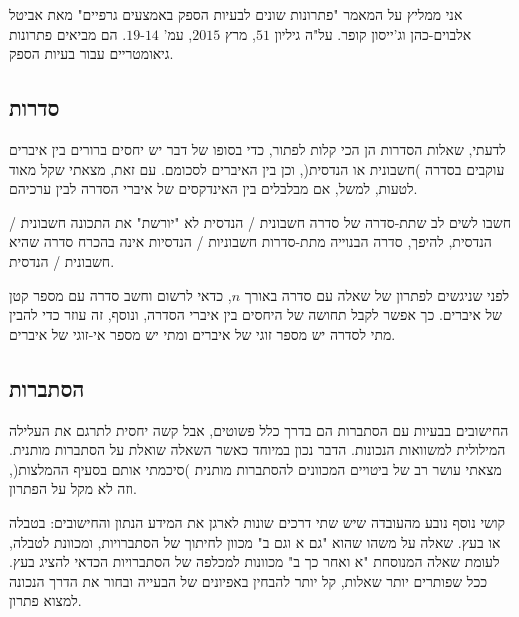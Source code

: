 אני ממליץ על המאמר "פתרונות שונים לבעיות הספק באמצעים גרפיים" מאת אביטל אלבוים-כהן וג'ייסון קופר. על"ה גיליון
$51$,
מרץ
$2015$,
עמ'
$14$-$19$.
הם מביאים פתרונות גיאומטריים עבור בעיות הספק.

\subsection*{סדרות}

לדעתי, שאלות הסדרות הן הכי קלות לפתור, כדי בסופו של דבר יש יחסים ברורים בין איברים עוקבים בסדרה )חשבונית או הנדסית(, וכן בין האיברים לסכומם. עם זאת, מצאתי שקל מאוד לטעות, למשל, אם מבלבלים בין האינדקסים של איברי הסדרה לבין ערכיהם.

חשבו לשים לב שתת-סדרה של סדרה חשבונית / הנדסית לא "יורשת" את התכונה חשבונית / הנדסית, להיפך, סדרה הבנוייה מתת-סדרות חשבוניות / הנדסיות אינה בהכרח סדרה שהיא חשבונית / הנדסית.

לפני שניגשים לפתרון של שאלה עם סדרה באורך
$n$,
כדאי לרשום וחשב סדרה עם מספר קטן של איברים. כך אפשר לקבל תחושה של היחסים בין איברי הסדרה, ונוסף, זה עוזר כדי להבין מתי לסדרה יש מספר זוגי של איברים ומתי יש מספר אי-זוגי של איברים.

\np

\subsection*{הסתברות}

החישובים בבעיות עם הסתברות הם בדרך כלל פשוטים, אבל קשה יחסית לתרגם את העלילה המילולית למשוואות הנכונות. הדבר נכון במיוחד כאשר השאלה שואלת על הסתברות מותנית. מצאתי עושר רב של ביטויים המכוונים להסתברות מותנית )סיכמתי אותם בסעיף ההמלצות(, וזה לא מקל על הפתרון.

קושי נוסף נובע מהעובדה שיש שתי דרכים שונות לארגן את המידע הנתון והחישובים: בטבלה או בעץ. שאלה על משהו שהוא "גם א וגם ב" מכוון לחיתוך של הסתברויות, ומכוונת לטבלה, לעומת שאלה המנוסחת "א ואחר כך ב" מכוונות למכלפה של הסתברויות הכדאי להציג בעץ. ככל שפותרים יותר שאלות, 
קל יותר להבחין באפיונים של הבעייה ובחור את הדרך הנכונה למצוא פתרון.


